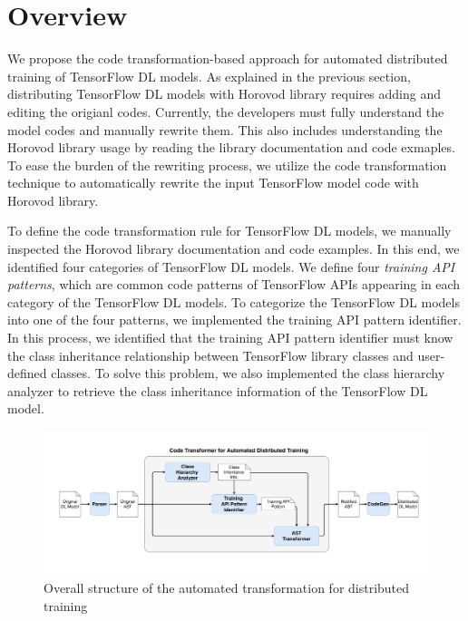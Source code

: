 \section{Overview}
 

We propose the code transformation-based approach 
for automated distributed training of TensorFlow DL models.
As explained in the previous section, distributing TensorFlow DL models
with Horovod library requires adding and editing the origianl codes.
Currently, the developers must fully understand the model codes and
manually rewrite them.
This also includes understanding the Horovod library usage by reading
the library documentation and code exmaples.
To ease the burden of the rewriting process, 
we utilize the code transformation technique to automatically rewrite the
input TensorFlow model code with Horovod library.

To define the code transformation rule for TensorFlow DL models,
we manually inspected the Horovod library documentation and code examples.
In this end, we identified four categories of TensorFlow DL models.
We define four \textit{training API patterns}, which are common code patterns of 
TensorFlow APIs appearing in each category of the TensorFlow DL models.
To categorize the TensorFlow DL models into one of the four patterns, 
we implemented the training API pattern identifier. 
In this process, we identified that the training API pattern identifier 
must know the class inheritance relationship between TensorFlow library 
classes and user-defined classes.
To solve this problem, we also implemented the class hierarchy analyzer to
retrieve the class inheritance information of the TensorFlow DL model.

\begin{figure}[ht!]
  \centering
  \includegraphics[width=\textwidth]{overview_diagram.pdf}
  \caption{Overall structure of the 
  automated transformation for distributed training}
  \label{sysarch}
\end{figure}

